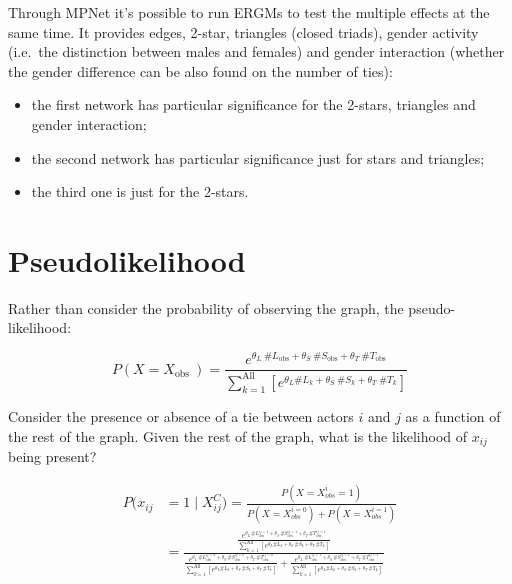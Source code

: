 \documentclass[
  notitlepage,
  onecolumn,
  openany]{book}
\providecommand{\tightlist}{%
  \setlength{\itemsep}{0pt}\setlength{\parskip}{0pt}}
\begin{document}
Through MPNet it's possible to run ERGMs to test the multiple effects at the same time. It provides edges, 2-star, triangles (closed triads), gender activity (i.e.~the distinction between males and females) and gender interaction (whether the gender difference can be also found on the number of ties):

\begin{itemize}
\tightlist
\item
  the first network has particular significance for the 2-stars, triangles and gender interaction;
\item
  the second network has particular significance just for stars and triangles;
\item
  the third one is just for the 2-stars.
\end{itemize}

\hypertarget{pseudolikelihood}{%
\section{Pseudolikelihood}\label{pseudolikelihood}}

Rather than consider the probability of observing the graph, the pseudo-likelihood:

\[
P\left(X=X_{\text {obs }}\right) = \frac{e^{\theta_{L}\ \# L_{\text {obs}}+\theta_{S} \ \# S_{\text {obs}}+\theta_{T}\ \# T_{\text {obs}}}}{\sum_{k=1}^{\text {All }}[e^{\theta_{L} \#L_{k}+\theta_{S} \ \# S_{k}+\theta_{T} \ \#T_{k}}]}
\]

Consider the presence or absence of a tie between actors \(i\) and \(j\) as a function of the rest of the graph. Given the rest of the graph, what is the likelihood of \(x_{ij}\) being present?

\[
\begin{aligned}
P(x_{ij} &=1 \mid X_{ij}^{C})=\frac{P\left(X=X_{obs}^{i}=1\right)}{{P}\left({X}={X}_{{obs}}^{{i}=0}\right)+{P}\left({X}={X}_{{obs}}^{{i}=1}\right)}\\
&= \frac{\frac{e^{\theta_{L}\ \# L_{\text {obs}}^{ij=1}+\theta_{S} \ \# S_{\text {obs}}^{ij=1}+\theta_{T}\ \# T_{\text {obs}}^{ij=1}}}{\sum_{k=1}^{\text {All }}[e^{\theta_{L} \#L_{k}+\theta_{S} \ \# S_{k}+\theta_{T} \ \#T_{k}}]}}{\frac{e^{\theta_{L}\ \# L_{\text {obs}}^{ij=0}+\theta_{S} \ \# S_{\text {obs}}^{ij=0}+\theta_{T}\ \# T_{\text {obs}}^{ij=0}}}{\sum_{k=1}^{\text {All }}[e^{\theta_{L} \#L_{k}+\theta_{S} \ \# S_{k}+\theta_{T} \ \#T_{k}}]}+\frac{e^{\theta_{L}\ \# L_{\text {obs}}^{ij=1}+\theta_{S} \ \# S_{\text {obs}}^{ij=1}+\theta_{T}\ \# T_{\text {obs}}^{ij=1}}}{\sum_{k=1}^{\text {All }}[e^{\theta_{L} \#L_{k}+\theta_{S} \ \# S_{k}+\theta_{T} \ \#T_{k}}]}}
\end{aligned}
\]
\end{document}
